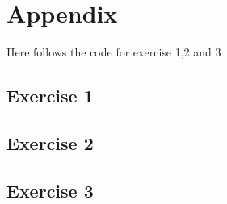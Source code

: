 \documentclass[a4paper, 10pt, reqno]{amsart}
\begin{document}
\section{Appendix}
Here follows the code for exercise 1,2 and 3

\subsection{Exercise 1}



\subsection{Exercise 2}



\subsection{Exercise 3}



\nocite{*}
{}

\end{document}
